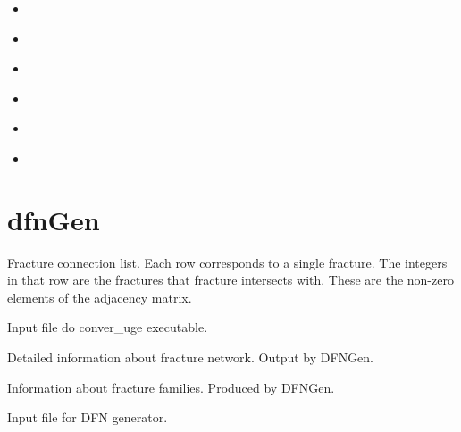 \documentclass[letterpaper,10pt,english]{sphinxmanual}
\begin{document}
\begin{itemize}
\item {} 
{\hyperref[\detokenize{output:pboundary-back-n-ex}]{}}

\item {} 
{\hyperref[\detokenize{output:pboundary-bottom-ex}]{}}

\item {} 
{\hyperref[\detokenize{output:pboundary-front-s-ex}]{}}

\item {} 
{\hyperref[\detokenize{output:pboundary-left-w-ex}]{}}

\item {} 
{\hyperref[\detokenize{output:pboundary-right-e-ex}]{}}

\item {} 
{\hyperref[\detokenize{output:pboundary-top-ex}]{}}

\end{itemize}


\section{dfnGen}
\label{\detokenize{output:id1}}

\label{\detokenize{output:connectivity-dat}}
Fracture connection list. Each row corresponds to a single fracture. The integers in that row are the fractures that fracture intersects with. These are the non-zero elements of the adjacency matrix.


\label{\detokenize{output:convert-uge-params-txt}}
Input file do conver\_uge executable.


\label{\detokenize{output:dfn-output-txt}}
Detailed information about fracture network. Output by DFNGen.


\label{\detokenize{output:families-dat}}
Information about fracture families. Produced by DFNGen.


\label{\detokenize{output:input-generator-dat}}
Input file for DFN generator.
\end{document}
